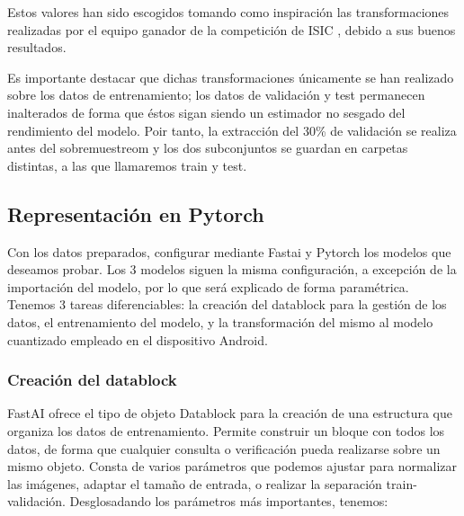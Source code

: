 Estos valores han sido escogidos tomando como inspiración las transformaciones realizadas por el equipo ganador de la competición de ISIC \cite{1stISIC}, debido a sus buenos resultados.

Es importante destacar que dichas transformaciones únicamente se han realizado sobre los datos de entrenamiento; los datos de validación y test permanecen inalterados de forma que éstos sigan siendo un estimador no sesgado del rendimiento del modelo. Poir tanto, la extracción del 30\% de validación se realiza antes del sobremuestreom y los dos subconjuntos se guardan en carpetas distintas, a las que llamaremos train y test.

\subsection{Representación en Pytorch}

Con los datos preparados, configurar mediante Fastai y Pytorch los modelos que deseamos probar. Los 3 modelos siguen la misma configuración, a excepción de la importación del modelo, por lo  que será explicado de forma paramétrica. Tenemos 3 tareas diferenciables: la creación del datablock para la gestión de los datos, el entrenamiento del modelo, y la transformación del mismo al modelo cuantizado empleado en el dispositivo Android.

\subsubsection{Creación del datablock}

FastAI ofrece el tipo de objeto Datablock para la creación de una estructura que organiza los datos de entrenamiento. Permite construir un bloque con todos los datos, de forma que cualquier consulta o verificación pueda realizarse sobre un mismo objeto. Consta de varios parámetros que podemos ajustar para normalizar las imágenes, adaptar el tamaño de entrada, o realizar la separación train-validación. Desglosadando los parámetros más importantes, tenemos:

